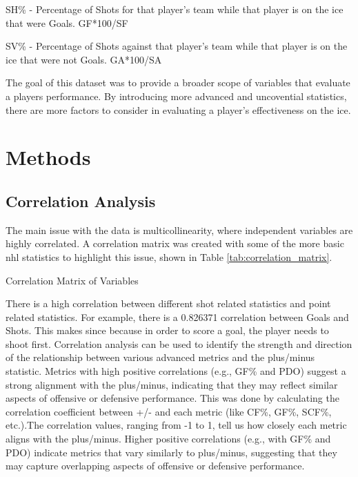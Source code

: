 \documentclass[12pt]{article}
\begin{document}
SH\% - Percentage of Shots for that player's team while that player is on the ice that were Goals. GF*100/SF

SV\% - Percentage of Shots against that player's team while that player is on the ice that were not Goals. GA*100/SA


The goal of this dataset was to provide a broader scope of variables that evaluate a players performance. By introducing more
advanced and uncovential statistics, there are more factors to consider in evaluating a player's effectiveness on the ice.


\section{Methods}
\label{sec:meth}

\subsection{Correlation Analysis}
The main issue with the data is multicollinearity, where independent variables are highly correlated. A correlation matrix was created 
with some of the more basic nhl statistics to highlight this issue, shown in Table \ref{tab:correlation_matrix}.

\begin{table}[h!]
  \centering
  \caption{Correlation Matrix of Variables}
  
  \label{tab:correlation_matrix}
\end{table}


There is a high correlation between different shot related statistics and point related statistics. For example, there is a 
0.826371 correlation between Goals and Shots. This makes since because in order to score a goal, the player needs to shoot first.
Correlation analysis can be used to identify the strength and direction of the relationship between various advanced metrics and 
the plus/minus statistic. Metrics with high positive correlations (e.g., GF\% and PDO) suggest a strong alignment with the plus/minus, 
indicating that they may reflect similar aspects of offensive or defensive performance. This was done by calculating the correlation 
coefficient between +/- and each metric (like CF\%, GF\%, SCF\%, etc.).The correlation values, ranging from -1 to 1, tell us how closely 
each metric aligns with the plus/minus. Higher positive correlations (e.g., with GF\% and PDO) indicate metrics that vary similarly to 
plus/minus, suggesting that they may capture overlapping aspects of offensive or defensive performance.
\end{document}
